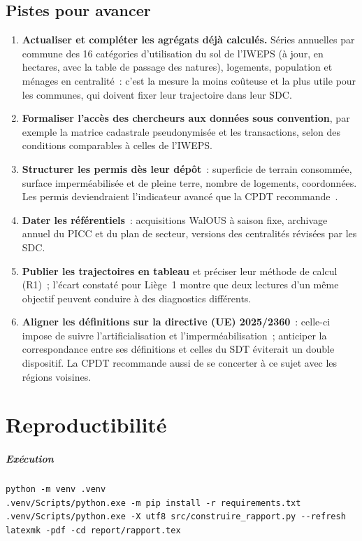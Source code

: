 \documentclass[11pt,a4paper]{report}
\begin{document}
\section{Pistes pour avancer}
\begin{enumerate}[label=\textbf{P\arabic*}]
\item \textbf{Actualiser et compléter les agrégats déjà calculés.} Séries annuelles par commune des 16 catégories d'utilisation du sol de l'IWEPS (à jour, en hectares, avec la table de passage des natures), logements, population et ménages en centralité~: c'est la mesure la moins coûteuse et la plus utile pour les communes, qui doivent fixer leur trajectoire dans leur SDC.
\item \textbf{Formaliser l'accès des chercheurs aux données sous convention}, par exemple la matrice cadastrale pseudonymisée et les transactions, selon des conditions comparables à celles de l'IWEPS.
\item \textbf{Structurer les permis dès leur dépôt}~: superficie de terrain consommée, surface imperméabilisée et de pleine terre, nombre de logements, coordonnées. Les permis deviendraient l'indicateur avancé que la CPDT recommande~\citep{cpdt2025}.
\item \textbf{Dater les référentiels}~: acquisitions WalOUS à saison fixe, archivage annuel du PICC et du plan de secteur, versions des centralités révisées par les SDC.
\item \textbf{Publier les trajectoires en tableau} et préciser leur méthode de calcul (R1)~; l'écart constaté pour Liège~1 montre que deux lectures d'un même objectif peuvent conduire à des diagnostics différents.
\item \textbf{Aligner les définitions sur la directive (UE) 2025/2360}~: celle-ci impose de suivre l'artificialisation et l'imperméabilisation~; anticiper la correspondance entre ses définitions et celles du SDT éviterait un double dispositif. La CPDT recommande aussi de se concerter à ce sujet avec les régions voisines.
\end{enumerate}

\chapter{Reproductibilité}
\label{ann:repro}
\paragraph{Exécution}
\begin{verbatim}
python -m venv .venv
.venv/Scripts/python.exe -m pip install -r requirements.txt
.venv/Scripts/python.exe -X utf8 src/construire_rapport.py --refresh
latexmk -pdf -cd report/rapport.tex
\end{verbatim}
\end{document}
